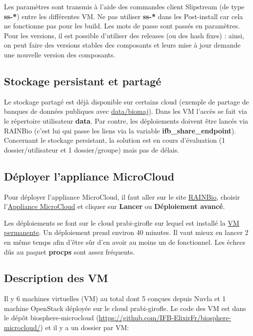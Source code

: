 Les paramètres sont transmis à l'aide des commandes client Slipstream (de type \textbf{ss-*}) entre les différentes VM. Ne pas utiliser \textbf{ss-*} dans les Post-install car cela ne fonctionne pas pour les build. Les mots de passe sont passés en paramètres.
Pour les versions, il est possible d'utiliser des releases (ou des hash fixes) : ainsi, on peut faire des versions stables des composants et leurs mise à jour demande une nouvelle version des composants.

\subsection{Stockage persistant et partagé}

Le stockage partagé est déjà disponible sur certains cloud (exemple de partage de banques de données publiques avec \href{https://biosphere.france-bioinformatique.fr/data/biomaj}{data/biomaj}). Dans les VM l'accès se fait via le répertoire utilisateur \textbf{data}. Par contre, les déploiements doivent être lancés via RAINBio (c’est lui qui passe les liens via la variable \textbf{ifb\_share\_endpoint}).
Concernant le stockage persistant, la solution est en cours d’évaluation (1 dossier/utilisateur et 1 dossier/groupe) mais pas de délais.

\subsection{Déployer l'appliance MicroCloud}

Pour déployer l'appliance MicroCloud, il faut aller sur le site  \href{https://biosphere.france-bioinformatique.fr/catalogue/}{RAINBio}, choisir l’\href{https://biosphere.france-bioinformatique.fr/catalogue/appliance/150/}{Appliance MicroCloud} et cliquer sur \textbf{Lancer} ou \textbf{Déploiement avancé}.

Les déploiements se font sur le cloud prabi-girofle sur lequel est installé la \hyperref[VM permanente]{VM permanente}. Un déploiement prend environ 40 minutes. Il vaut mieux en lancer 2 en même temps afin d'être sûr d'en avoir au moins un de fonctionnel.
Les échecs dûs au paquet \textbf{procps} sont assez fréquents.

\subsection {Description des VM}

Il y 6 machines virtuelles (VM) au total dont 5 conçues depuis Nuvla et 1 machine OpenStack déployée sur le cloud prabi-girofle. Le code des VM est dans le dépôt biosphere-microcloud (\url{https://github.com/IFB-ElixirFr/biosphere-microcloud/}) et il y a un dossier par VM:

